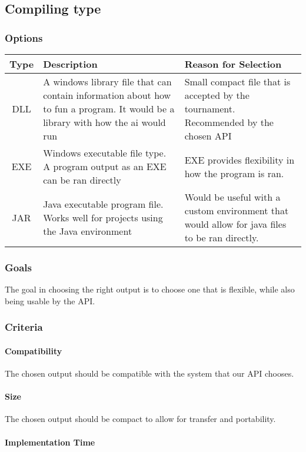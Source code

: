 \documentclass[10pt,letterpaper,onecolumn,draftclsnofoot]{IEEEtran}
\begin{document}
\subsection{Compiling type}
\subsubsection{Options}
\begin{center}
	\begin{tabular}{ ||C|L|L|| } 
		\hline
		Type & Description & Reason for Selection \\
		\hline
		DLL & A windows library file that can contain information about how to fun a program. It would be a library with how the ai would run & Small compact file that is accepted by the tournament. Recommended by the chosen API \\ 
		\hline
		EXE & Windows executable file type. A program output as an EXE can be ran directly & EXE provides flexibility in how the program is ran. \\ 
		\hline
		JAR & Java executable program file. Works well for projects using the Java environment & Would be useful with a custom environment that would allow for java files to be ran directly. \\ 
		\hline
	\end{tabular}
\end{center}
\subsubsection{Goals}
The goal in choosing the right output is to choose one that is flexible, while also being usable by the API.
\subsubsection{Criteria}
\paragraph{Compatibility}
The chosen output should be compatible with the system that our API chooses.
\paragraph{Size}
The chosen output should be compact to allow for transfer and portability.
\paragraph{Implementation Time}
\end{document}
